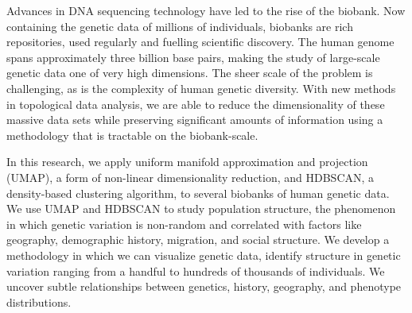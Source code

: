 Advances in DNA sequencing technology have led to the rise of the biobank. Now containing the genetic data of millions of individuals, biobanks are rich repositories, used regularly and fuelling scientific discovery. The human genome spans approximately three billion base pairs, making the study of large-scale genetic data one of very high dimensions. The sheer scale of the problem is challenging, as is the complexity of human genetic diversity. With new methods in topological data analysis, we are able to reduce the dimensionality of these massive data sets while preserving significant amounts of information using a methodology that is tractable on the biobank-scale.

In this research, we apply uniform manifold approximation and projection (UMAP), a form of non-linear dimensionality reduction, and HDBSCAN, a density-based clustering algorithm, to several biobanks of human genetic data. We use UMAP and HDBSCAN to study population structure, the phenomenon in which genetic variation is non-random and correlated with factors like geography, demographic history, migration, and social structure. We develop a methodology in which we can visualize genetic data, identify structure in genetic variation ranging from a handful to hundreds of thousands of individuals. We uncover subtle relationships between genetics, history, geography, and phenotype distributions.